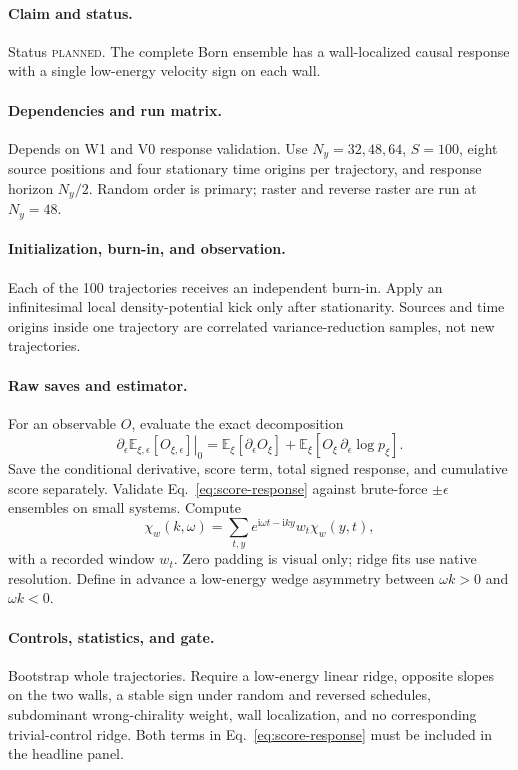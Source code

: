 \documentclass[aps,prx,onecolumn,nofootinbib,superscriptaddress,longbibliography]{revtex4-2}
\newcommand{\ii}{\boldsymbol{\mathrm{i}}}
\newcommand{\E}{\mathbb{E}}
\newcommand{\planned}{\textsc{planned}}
\begin{document}
\paragraph{Claim and status.}
Status \planned.  The complete Born ensemble has a wall-localized causal response with a
single low-energy velocity sign on each wall.

\paragraph{Dependencies and run matrix.}
Depends on W1 and V0 response validation.  Use $N_y=32,48,64$, $S=100$, eight source
positions and four stationary time origins per trajectory, and response horizon $N_y/2$.
Random order is primary; raster and reverse raster are run at $N_y=48$.

\paragraph{Initialization, burn-in, and observation.}
Each of the 100 trajectories receives an independent burn-in.  Apply an infinitesimal local
density-potential kick only after stationarity.  Sources and time origins inside one
trajectory are correlated variance-reduction samples, not new trajectories.

\paragraph{Raw saves and estimator.}
For an observable $O$, evaluate the exact decomposition
\begin{equation}
 \left.\partial_\epsilon\E_{\xi,\epsilon}[O_{\xi,\epsilon}]\right|_0
 =\E_\xi[\partial_\epsilon O_\xi]
 +\E_\xi[O_\xi\,\partial_\epsilon\log p_\xi].
 \label{eq:score-response}
\end{equation}
Save the conditional derivative, score term, total signed response, and cumulative score
separately.  Validate Eq.~\eqref{eq:score-response} against brute-force $\pm\epsilon$
ensembles on small systems.  Compute
\begin{equation}
 \chi_w(k,\omega)=\sum_{t,y}e^{\ii\omega t-\ii ky}w_t\chi_w(y,t),
\end{equation}
with a recorded window $w_t$.  Zero padding is visual only; ridge fits use native
resolution.  Define in advance a low-energy wedge asymmetry between $\omega k>0$ and
$\omega k<0$.

\paragraph{Controls, statistics, and gate.}
Bootstrap whole trajectories.  Require a low-energy linear ridge, opposite slopes on the
two walls, a stable sign under random and reversed schedules, subdominant wrong-chirality
weight, wall localization, and no corresponding trivial-control ridge.  Both terms in
Eq.~\eqref{eq:score-response} must be included in the headline panel.
\end{document}
